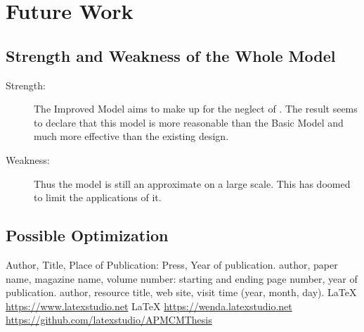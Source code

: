 \documentclass{apmcmthesis}
\begin{document}
\section{Future Work}
\subsection{Strength and Weakness of the Whole Model}
\begin{description}
\item[Strength:] The Improved Model aims to make up for the neglect of         . The result seems to declare that this model is more reasonable than the Basic Model and much more effective than the existing design.
\item[Weakness:] Thus the model is still an approximate on a large scale. This has doomed to limit the applications of it.
\end{description}
\subsection{Possible Optimization}


\begin{thebibliography}{9}%
 Author, Title, Place of Publication: Press, Year of publication.
 author, paper name, magazine name, volume number: starting and ending
page number, year of publication.
 author, resource title, web site, visit time (year, month, day).
  \LaTeX{} \url{https://www.latexstudio.net}
  \LaTeX{} \url{https://wenda.latexstudio.net}
    \url{https://github.com/latexstudio/APMCMThesis}
\end{thebibliography}

\newpage
\end{document}
